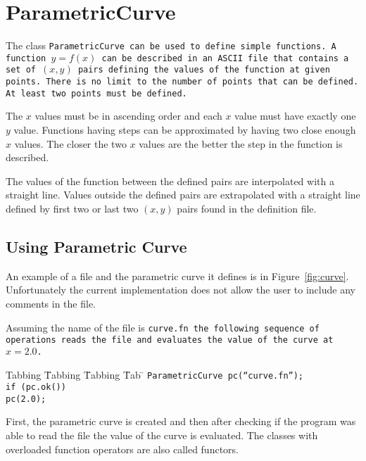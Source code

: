 
\section{ParametricCurve}

The  class  \tt ParametricCurve  \rm  can  be  used to  define  simple
functions.  A function $y = f(x)$ can  be described in an  ASCII file
that  contains a  set  of $(x,y)$  pairs  defining the  values of  the
function at given  points.  There is no limit to  the number of points
that can be defined. At least two points must be defined.

The $x$ values must be in ascending order and each $x$ value must have
exactly one $y$ value.  Functions  having steps can be approximated by
having two close enough $x$ values.  The closer the two $x$ values are
the better the step in the function is described.

The values of the function  between the defined pairs are interpolated
with  a   straight  line.  Values   outside  the  defined   pairs  are
extrapolated  with  a straight  line  defined  by  first two  or  last
two $(x,y)$ pairs found in the definition file.

\subsection{Using Parametric Curve}
 
An example of a file and the parametric curve it defines 
is in Figure~\ref{fig:curve}. Unfortunately the current implementation
does not allow the user to include any comments in the file. 

Assuming the name of the file is \tt curve.fn \rm the following 
sequence of operations reads the file and evaluates the value of the
curve at $x = 2.0$.
\begin{tabbing}
Tabbing \= Tabbing \= Tabbing \= Tab \= \kill
\>\>\>\tt  ParametricCurve pc(``curve.fn''); \\
\>\>\>\tt  if (pc.ok()) \\
\>\>\>\>\tt pc(2.0);
\end{tabbing}
First, the parametric curve is created and then after checking
if the program was able to read the file the value of the curve
is evaluated. The classes with overloaded function operators are
also called functors.

